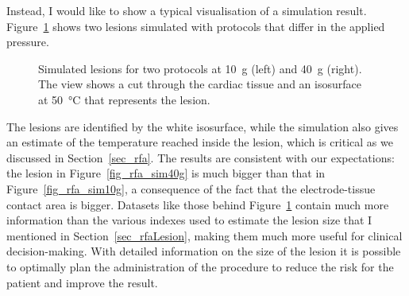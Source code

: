 Instead, I would like to show a typical visualisation of a simulation result.
Figure~\ref{fig_rfa_sim} shows two lesions simulated with protocols that differ in the applied pressure.
\begin{figure}
  \centering
    \quad
    \caption{Simulated lesions for two protocols at \SI{10}{g} (left) and \SI{40}{g} (right). The view shows a cut through the cardiac tissue and an isosurface at \SI{50}{\celsius} that represents the lesion.}
    \label{fig_rfa_sim}
\end{figure}
The lesions are identified by the white isosurface, while the simulation also gives an estimate of the temperature reached inside the lesion, which is critical as we discussed in Section~\ref{sec_rfa}.
The results are consistent with our expectations: the lesion in Figure~\ref{fig_rfa_sim40g} is much bigger than that in Figure~\ref{fig_rfa_sim10g}, a consequence of the fact that the electrode-tissue contact area is bigger.
Datasets like those behind Figure~\ref{fig_rfa_sim} contain much more information than the various indexes used to estimate the lesion size that I mentioned in Section~\ref{sec_rfaLesion}, making them much more useful for clinical decision-making.
With detailed information on the size of the lesion it is possible to optimally plan the administration of the procedure to reduce the risk for the patient and improve the result.


